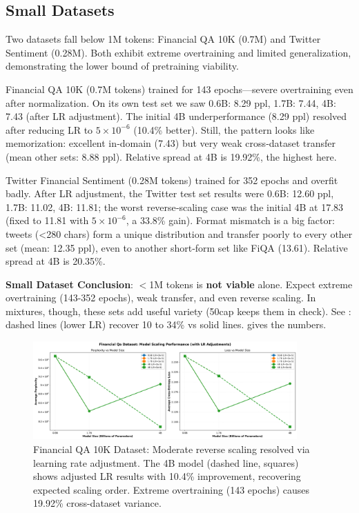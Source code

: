 





\subsection{Small Datasets}

Two datasets fall below 1M tokens: Financial QA 10K (0.7M) and Twitter Sentiment (0.28M). Both exhibit extreme overtraining and limited generalization, demonstrating the lower bound of pretraining viability.

Financial QA 10K (0.7M tokens) trained for 143 epochs—severe overtraining even after normalization. On its own test set we saw 0.6B: 8.29 ppl, 1.7B: 7.44, 4B: 7.43 (after LR adjustment). The initial 4B underperformance (8.29 ppl) resolved after reducing LR to $5\times10^{-6}$ (10.4\% better). Still, the pattern looks like memorization: excellent in‑domain (7.43) but very weak cross‑dataset transfer (mean other sets: 8.88 ppl). Relative spread at 4B is 19.92\%, the highest here.

Twitter Financial Sentiment (0.28M tokens) trained for 352 epochs and overfit badly. After LR adjustment, the Twitter test set results were 0.6B: 12.60 ppl, 1.7B: 11.02, 4B: 11.81; the worst reverse‑scaling case was the initial 4B at 17.83 (fixed to 11.81 with $5\times10^{-6}$, a 33.8\% gain). Format mismatch is a big factor: tweets (<280 chars) form a unique distribution and transfer poorly to every other set (mean: 12.35 ppl), even to another short‑form set like FiQA (13.61). Relative spread at 4B is 20.35\%.

\textbf{Small Dataset Conclusion}: $<$1M tokens is \textbf{not viable} alone. Expect extreme overtraining (143-352 epochs), weak transfer, and even reverse scaling. In mixtures, though, these sets add useful variety (50cap keeps them in check). See : dashed lines (lower LR) recover 10 to 34\% vs solid lines.  gives the numbers.

\begin{figure}[h]
\centering
\includegraphics[width=0.9\textwidth]{figures/scaling_financial_qa.png}
\caption[Financial QA 10K Dataset: Reverse Scaling]{Financial QA 10K Dataset: Moderate reverse scaling resolved via learning rate adjustment. The 4B model (dashed line, squares) shows adjusted LR results with 10.4\% improvement, recovering expected scaling order. Extreme overtraining (143 epochs) causes 19.92\% cross-dataset variance.}
\label{fig:scaling_financial_qa}
\end{figure}

